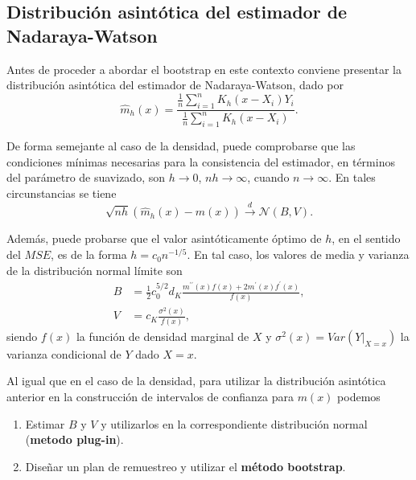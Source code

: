 \documentclass[]{book}
\theoremstyle{definition}
\theoremstyle{definition}
\theoremstyle{definition}
\theoremstyle{remark}
\begin{document}
\subsection{Distribución asintótica del estimador de
Nadaraya-Watson}\label{distribucion-asintotica-del-estimador-de-nadaraya-watson}

Antes de proceder a abordar el bootstrap en este contexto conviene
presentar la distribución asintótica del estimador de Nadaraya-Watson,
dado por
\[\hat{m}_{h}\left( x \right) =\frac{\frac{1}{n}\sum_{i=1}^{n}K_{h}\left(
x-X_i \right) Y_i}{\frac{1}{n}\sum_{i=1}^{n}K_{h}\left( x-X_i \right)}.\]

De forma semejante al caso de la densidad, puede comprobarse que las
condiciones mínimas necesarias para la consistencia del estimador, en
términos del parámetro de suavizado, son \(h\rightarrow 0\),
\(nh\rightarrow \infty\), cuando \(n\rightarrow \infty\). En tales
circunstancias se tiene
\[\sqrt{nh}\left( \hat{m}_{h}\left( x \right) -m\left( x \right) \right) \overset
{d}{\rightarrow }\mathcal{N}\left( B,V \right) \text{.}\]

Además, puede probarse que el valor asintóticamente óptimo de \(h\), en
el sentido del \(MSE\), es de la forma \(h=c_{0}n^{-1/5}\). En tal caso,
los valores de media y varianza de la distribución normal límite son
\[\begin{aligned}
B &= \frac{1}{2}c_{0}^{5/2}d_{K}\frac{m^{\prime \prime }\left( x \right)
f\left( x \right) +2m^{\prime}\left( x \right) f^{\prime}\left( x \right)}{
f\left( x \right)}, \\
V &= c_{K}\frac{\sigma^2\left( x \right)}{f\left( x \right)},
\end{aligned}\] siendo \(f\left( x \right)\) la función de densidad
marginal de \(X\) y
\(\sigma^2\left( x \right) =Var\left( \left. Y\right\vert _{X=x} \right)\)
la varianza condicional de \(Y\) dado \(X=x\).

Al igual que en el caso de la densidad, para utilizar la distribución
asintótica anterior en la construcción de intervalos de confianza para
\(m\left( x \right)\) podemos

\begin{enumerate}
\def\labelenumi{\arabic{enumi}.}
\item
  Estimar \(B\) y \(V\) y utilizarlos en la correspondiente distribución
  normal (\textbf{metodo plug-in}).
\item
  Diseñar un plan de remuestreo y utilizar el \textbf{método bootstrap}.
\end{enumerate}
\end{document}
